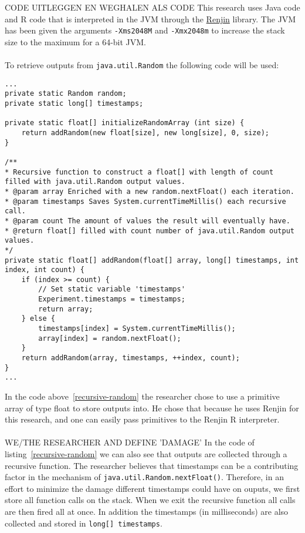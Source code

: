\documentclass[
10pt, %
a4paper, %
oneside, %
headinclude,footinclude, %
BCOR5mm, %
]{scrartcl}
\begin{document}
CODE UITLEGGEN EN WEGHALEN ALS CODE
This research uses Java code and R code that is interpreted in the JVM through the \href{http://www.renjin.org/}{Renjin} library. The JVM has been given the arguments \texttt{-Xms2048M} and \texttt{-Xmx2048m} to increase the stack size to the maximum for a 64-bit JVM.
\\
\\
To retrieve outputs from \texttt{java.util.Random} the following code will be used:
\begin{lstlisting}[label=recursive-random,caption=Retrieve random values through a recursive function and store them in an array]
...
private static Random random;
private static long[] timestamps;

private static float[] initializeRandomArray (int size) {
	return addRandom(new float[size], new long[size], 0, size);
}
	
/**
* Recursive function to construct a float[] with length of count filled with java.util.Random output values.
* @param array Enriched with a new random.nextFloat() each iteration.
* @param timestamps Saves System.currentTimeMillis() each recursive call.
* @param count The amount of values the result will eventually have.
* @return float[] filled with count number of java.util.Random output values.
*/
private static float[] addRandom(float[] array, long[] timestamps, int index, int count) {
	if (index >= count) {
		// Set static variable 'timestamps'
		Experiment.timestamps = timestamps;
		return array;
	} else {
		timestamps[index] = System.currentTimeMillis();
		array[index] = random.nextFloat();
	}
	return addRandom(array, timestamps, ++index, count);
}
...
\end{lstlisting}
In the code above~\ref{recursive-random} the researcher chose to use a primitive array of type float to store outputs into. He chose that because he uses Renjin for this research, and one can easily pass primitives to the Renjin R interpreter.
\\
\\
WE/THE RESEARCHER AND DEFINE 'DAMAGE'
In the code of listing~\ref{recursive-random} we can also see that outputs are collected through a recursive function. The researcher believes that timestamps can be a contributing factor in the mechanism of \texttt{java.util.Random.nextFloat()}. Therefore, in an effort to minimize the damage different timestamps could have on ouputs, we first store all function calls on the stack. When we exit the recursive function all calls are then fired all at once. In addition the timestamps (in milliseconds) are also collected and stored in \texttt{long[] timestamps}.
\end{document}
